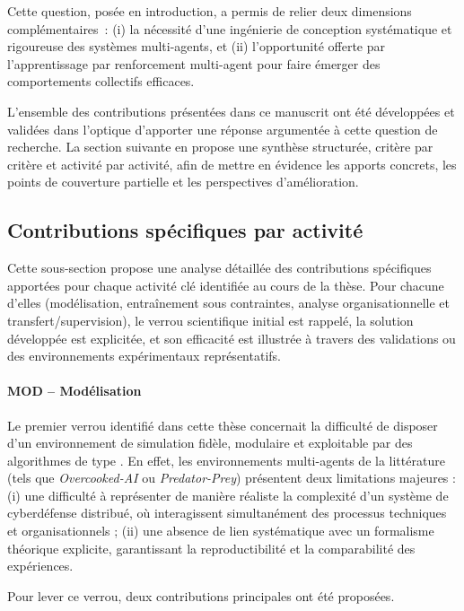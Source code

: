\noindent
Cette question, posée en introduction, a permis de relier deux dimensions complémentaires~:
(i) la nécessité d’une ingénierie de conception systématique et rigoureuse des systèmes multi-agents, et
(ii) l’opportunité offerte par l’apprentissage par renforcement multi-agent pour faire émerger des comportements collectifs efficaces.

L’ensemble des contributions présentées dans ce manuscrit ont été développées et validées dans l’optique d’apporter une réponse argumentée à cette question de recherche. La section suivante en propose une synthèse structurée, critère par critère et activité par activité, afin de mettre en évidence les apports concrets, les points de couverture partielle et les perspectives d’amélioration.


\subsection*{Contributions spécifiques par activité}

Cette sous-section propose une analyse détaillée des contributions spécifiques apportées pour chaque activité clé identifiée au cours de la thèse. Pour chacune d’elles (modélisation, entraînement sous contraintes, analyse organisationnelle et transfert/supervision), le verrou scientifique initial est rappelé, la solution développée est explicitée, et son efficacité est illustrée à travers des validations ou des environnements expérimentaux représentatifs.

\paragraph{MOD – Modélisation}

Le premier verrou identifié dans cette thèse concernait la difficulté de disposer d’un environnement de simulation fidèle, modulaire et exploitable par des algorithmes de type .
En effet, les environnements multi-agents de la littérature (tels que \textit{Overcooked-AI} ou \textit{Predator-Prey}) présentent deux limitations majeures :
(i) une difficulté à représenter de manière réaliste la complexité d’un système de cyberdéfense distribué, où interagissent simultanément des processus techniques et organisationnels ;
(ii) une absence de lien systématique avec un formalisme théorique explicite, garantissant la reproductibilité et la comparabilité des expériences.

Pour lever ce verrou, deux contributions principales ont été proposées.

